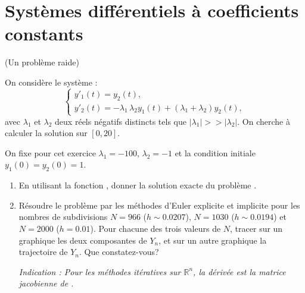 \documentclass[a4paper,12pt,reqno]{amsart}
\begin{document}
\section{Systèmes différentiels à coefficients constants}


\begin{exo} (Un problème raide)

On considère le système :
  $$
    \begin{cases}
      y'_1(t) = y_2(t),\\
      y'_2(t) = -\lambda_1 \, \lambda_2 y_1(t)+(\lambda_1+\lambda_2) y_2(t),
    \end{cases}
  $$
avec $\lambda_1$ et $\lambda_2$ deux réels négatifs distincts tels que $|\lambda_1| >> |\lambda_2|$. On  cherche à calculer la solution sur $[0,20]$.

On fixe pour cet exercice $\lambda_1=-100$, $\lambda_2=-1$ et la condition initiale $y_{1}(0)=y_{2}(0)=1$.
\begin{enumerate}
  \item En utilisant la fonction , donner la solution exacte du problème .
  \item Résoudre le problème par les méthodes d'Euler explicite et implicite pour les nombres de subdivisions $N = 966$ ($h\sim 0.0207$), $N = 1030$ ($h\sim 0.0194$) et $N = 2000$ ($h = 0.01$). Pour chacune des trois valeurs de $N$, tracer sur un graphique les deux composantes de $Y_{n}$, et sur un autre graphique la trajectoire de $Y_{n}$.
  Que constatez-vous?

  \textit{Indication : Pour les méthodes itératives sur $\mathbb{R}^{n}$, la \og{}dérivée\fg{}  est la matrice jacobienne de .}
\end{enumerate}
\end{exo}
\end{document}
